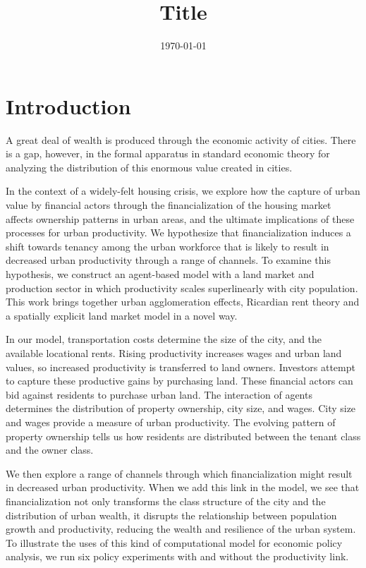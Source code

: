 \documentclass[a4paper]{article}
\title{Title}
\author{ }
\date{\today}
\theoremstyle{definition}
\theoremstyle{plain}
\begin{document}
\maketitle


\begin{abstract}
\end{abstract}

\section{Introduction}


A great deal of wealth is produced through the economic activity of cities. There is a gap, however, in the formal apparatus in standard economic theory for analyzing the distribution of this enormous value created in cities. 

In the context of a widely-felt housing crisis, we explore how the capture of urban value by financial actors through the financialization of the housing market affects ownership patterns in urban areas, and the ultimate implications of these processes for urban productivity.  We hypothesize that financialization induces a shift towards tenancy among the urban workforce that is likely to result in decreased urban productivity through a range of channels. To examine this hypothesis, we construct an agent-based model with a land market and production sector in which productivity scales superlinearly with city population. This work brings together urban agglomeration effects, Ricardian rent theory and a spatially explicit land market model in a novel way. 

In our model, transportation costs determine the size of the city, and the available locational rents. Rising productivity increases wages and urban land values, so increased productivity is transferred to land owners. Investors attempt to capture these productive gains by purchasing land. These financial actors can bid against residents to purchase urban land. The interaction of agents determines the distribution of property ownership,  city size, and wages. City size and wages provide a measure of urban productivity. The evolving pattern of property ownership tells us how residents are distributed between the tenant class and the owner class. 

We then explore a range of channels through which financialization might result in decreased urban productivity. When we add this link in the model, we see that financialization not only transforms the class structure of the city and the distribution of urban wealth, it disrupts the relationship between population growth and productivity, reducing the wealth and resilience of the urban system. To illustrate the uses of this kind of computational model for economic policy analysis, we run six policy experiments with and without the productivity link.  
\end{document}
